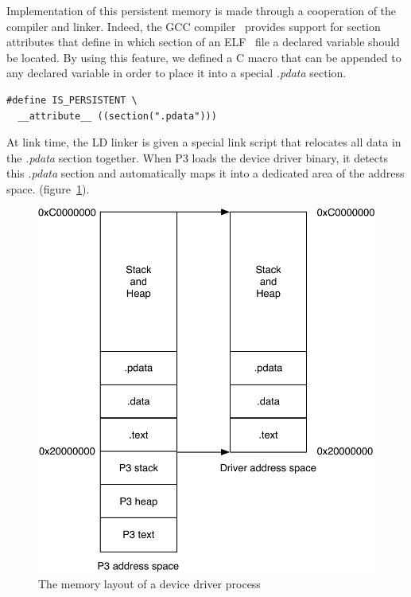 \documentclass{acm_proc_article-sp}
\begin{document}
Implementation of this persistent memory is made through a cooperation of the compiler and linker. Indeed, the GCC compiler~\cite{GCCManual} provides support for section attributes that define in which section of an ELF~\cite{ELFSpec} file a declared variable should be located. By using this feature, we defined a C macro that can be appended to any declared variable in order to place it into a special \emph{.pdata} section.

\begin{verbatim}
#define IS_PERSISTENT \
  __attribute__ ((section(".pdata")))
\end{verbatim}

At link time, the LD linker is given a special link script that relocates all data in the \emph{.pdata} section together. When P3 loads the device driver binary, it detects this \emph{.pdata} section and automatically maps it into a dedicated area of the address space. (figure~\ref{fig:layout}).

\begin{figure}[ht]
\begin{center}
\includegraphics[scale=0.5]{figures/layout}
\caption{The memory layout of a device driver process}
\label{fig:layout}
\end{center}
\end{figure}
\end{document}
